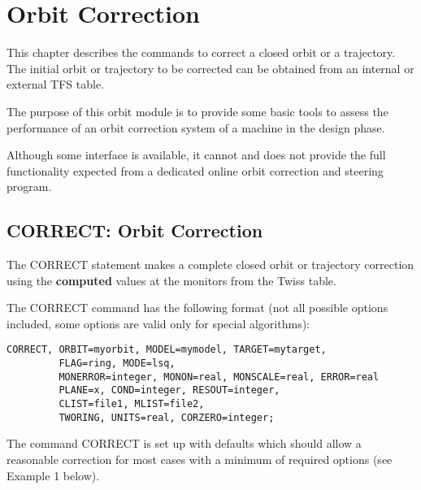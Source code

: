 
\chapter{Orbit Correction}  

This chapter describes the commands to correct a closed orbit or a
trajectory. The initial orbit or trajectory to be corrected can be
obtained  from an internal or external TFS table.   

The purpose of this orbit module is to provide some basic tools to
assess the performance of an orbit correction system of a machine in the
design phase.  

Although some interface is available, it cannot and does not provide the
full functionality expected from a dedicated online orbit correction and
steering program.  

%
\section{CORRECT: Orbit Correction}  
\label{sec:correct}

The CORRECT statement makes a complete closed orbit  or trajectory
correction using the \textbf{computed} values at the monitors  from the
Twiss table.   

The CORRECT command has the following format (not all possible options
included, some options are valid only for special algorithms):  

\begin{verbatim}
CORRECT, ORBIT=myorbit, MODEL=mymodel, TARGET=mytarget,
         FLAG=ring, MODE=lsq,  
         MONERROR=integer, MONON=real, MONSCALE=real, ERROR=real
         PLANE=x, COND=integer, RESOUT=integer,
         CLIST=file1, MLIST=file2,
         TWORING, UNITS=real, CORZERO=integer;  
\end{verbatim} 

The command CORRECT is set up with defaults which should allow a
reasonable correction for most cases with a minimum of required options
(see Example 1 below).  

